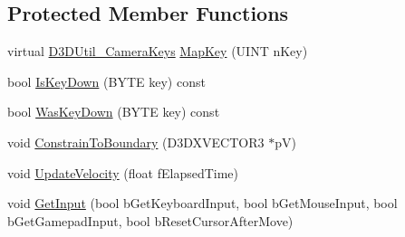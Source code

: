 \subsection*{Protected Member Functions}
\begin{DoxyCompactItemize}
\item 
virtual \hyperlink{_d_x_u_tmisc_8h_a4b2404de98d0b5f4a0efe1a7752fffa2}{D3DUtil\_\-CameraKeys} \hyperlink{class_c_base_camera_afb3c6111e9b929ddc40b65dded48d17f}{MapKey} (UINT nKey)
\item 
bool \hyperlink{class_c_base_camera_ac00770963442a7527b0fafe4a9ade260}{IsKeyDown} (BYTE key) const 
\item 
bool \hyperlink{class_c_base_camera_ab4e5634db9c77f98b4f1f87b4de391dd}{WasKeyDown} (BYTE key) const 
\item 
void \hyperlink{class_c_base_camera_a1d888b7ae8d6c49ee564720bcaee2e95}{ConstrainToBoundary} (D3DXVECTOR3 $\ast$pV)
\item 
void \hyperlink{class_c_base_camera_afcca5c9bdc793eb6f1f8c0530b8b93f2}{UpdateVelocity} (float fElapsedTime)
\item 
void \hyperlink{class_c_base_camera_ac0f6595e3bddfd13d620f5a38598192b}{GetInput} (bool bGetKeyboardInput, bool bGetMouseInput, bool bGetGamepadInput, bool bResetCursorAfterMove)
\end{DoxyCompactItemize}
